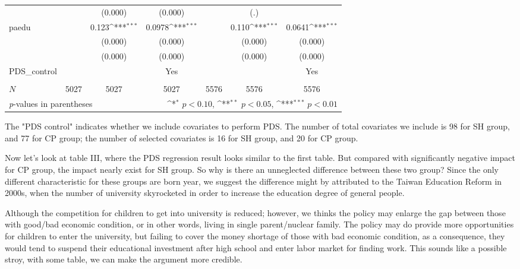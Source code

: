 \documentclass[]{AEA}
\def\sym#1{\ifmmode^{#1}\else\(^{#1}\)\fi}
\begin{document}
\begin{center}
\begin{table}
\begin{tabular}{l*{6}c}
                &                     &     (0.000)         &     (0.000)         &                     &         (.)         &                     \\
    [1em]
    paedu       &                     &       0.123\sym{***}&      0.0978\sym{***}&                     &       0.110\sym{***}&      0.0641\sym{***}\\
            &                     &     (0.000)         &     (0.000)         &                     &     (0.000)         &     (0.000)         \\
            &                     &     (0.000)         &     (0.000)         &                     &     (0.000)         &     (0.000)         \\
    [1em]
    PDS\_control  &   &  &  Yes    &  &    &  Yes \\
    &   &      &      &   &      &      \\
    \hline
    \(N\)       &        5027         &        5027         &        5027         &        5576         &        5576         &        5576         \\
    \bottomrule
    \multicolumn{3}{l}{\footnotesize \textit{p}-values in parentheses} & \multicolumn{4}{r}{\footnotesize \sym{*} \(p<0.10\), \sym{**} \(p<0.05\), \sym{***} \(p<0.01\)}\\
    \end{tabular}
    \begin{tablenotes}
        The "PDS control" indicates whether we include covariates to perform PDS.  The number of total covariates we include is 98 for SH group, and 77 for CP group; the number of selected covariates is 16 for SH group, and 20 for CP group.
    \end{tablenotes}
    \end{table}
    \end{center}

    Now let's look at table III, where the PDS regression result looks similar to the first table.  But compared with significantly negative impact for CP group, the impact nearly exist for SH group.  So why is there an unneglected difference between these two group?  Since the only different characteristic for these groups are born year, we suggest the difference might by attributed to the Taiwan Education Reform in 2000s, when the number of university skyrocketed in order to increase the education degree of general people.  
    
    Although the competition for children to get into university is reduced; however, we thinks the policy may enlarge the gap between those with good/bad economic condition, or in other words, living in single parent/nuclear family.  The policy may do provide more opportunities for children to enter the university, but failing to cover the money shortage of those with bad economic condition, as a consequence, they would tend to suspend their educational investment after high school and enter labor market for finding work.  This sounds like a possible stroy, with some table, we can make the argument more credible.
\end{document}
